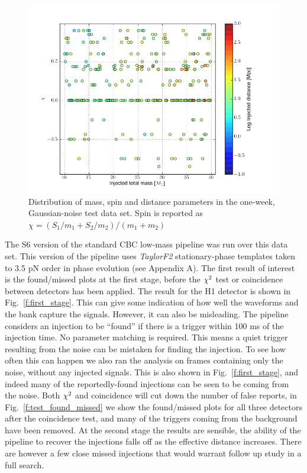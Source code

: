 \begin{figure}
  \includegraphics[width=\linewidth]{figures/ninja2_results/ninja2_test_dataset.png}
  \caption[Parameters of the NINJA-2 test one-week data set]{
  \label{f:ninja2_test_dataset}
Distribution of mass, spin and distance parameters in the one-week,
Gaussian-noise test data set.  Spin is reported as
$\chi=(S_1/m_1 + S_2/m_2)/(m_1+m_2)$
}
\end{figure}%


The S6 version of the standard CBC low-mass pipeline was run over this
data set.  This version of the pipeline uses \emph{TaylorF2}
stationary-phase templates taken to 3.5 pN order in phase evolution
(see Appendix A).  The first result of interest is the found/missed
plots at the first stage, before the $\chi^2$ test or coincidence
between detectors has been applied.  The result for the H1 detector is
shown in Fig.~\ref{f:first_stage}.  This can give some indication of
how well the waveforms and the bank capture the signals.  However, it
can also be misleading.  The pipeline considers an injection to be
``found'' if there is a trigger within 100 ms of the injection time.
No parameter matching is required.  This means a quiet trigger
resulting from the noise can be mistaken for finding the injection.
To see how often this can happen we also ran the analysis on frames
containing only the noise, without any injected signals.  This is also
shown in Fig.~\ref{f:first_stage}, and indeed many of the
reportedly-found injections can be seen to be coming from the noise.
Both $\chi^2$ and coincidence will cut down the number of false
reports, in Fig.~\ref{f:test_found_missed} we show the found/missed
plots for all three detectors after the coincidence test, and many of
the triggers coming from the background have been removed.  At the
second stage the results are sensible, the ability of the pipeline to
recover the injections falls off as the effective distance increases.
There are however a few close missed injections that would warrant
follow up study in a full search.


